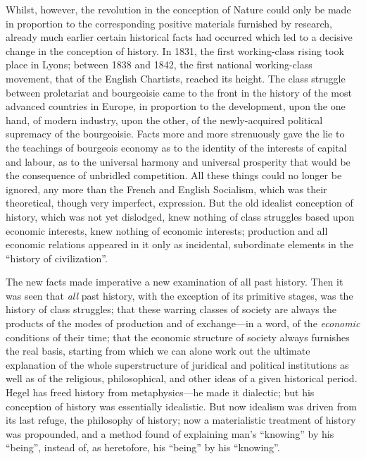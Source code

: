Whilst, however, the revolution in the conception of Nature could only be made
in proportion to the corresponding positive materials furnished by research,
already much earlier certain historical facts had occurred which led to a
decisive change in the conception of history. In 1831, the first working-class
rising took place in Lyons; between 1838 and 1842, the first national
working-class movement, that of the English Chartists, reached its height. The
class struggle between proletariat and bourgeoisie came to the front in the
history of the most advanced countries in Europe, in proportion to the
development, upon the one hand, of modern industry, upon the other, of the
newly-acquired political supremacy of the bourgeoisie. Facts more and more
strenuously gave the lie to the teachings of bourgeois economy as to the
identity of the interests of capital and labour, as to the universal harmony and
universal prosperity that would be the consequence of unbridled competition. All
these things could no longer be ignored, any more than the French and English
Socialism, which was their theoretical, though very imperfect, expression. But
the old idealist conception of history, which was not yet dislodged, knew
nothing of class struggles based upon economic interests, knew nothing of
economic interests; production and all economic relations appeared in it only as
incidental, subordinate elements in the ``history of civilization''.

The new facts made imperative a new examination of all past history. Then it was
seen that \emph{all} past history, with the exception of its primitive stages,
was the history of class struggles; that these warring classes of society are
always the products of the modes of production and of exchange---in a word, of
the \emph{economic} conditions of their time; that the economic structure of
society always furnishes the real basis, starting from which we can alone work
out the ultimate explanation of the whole superstructure of juridical and
political institutions as well as of the religious, philosophical, and other
ideas of a given historical period. Hegel has freed history from 
metaphysics---he made it dialectic; but his conception of history was
essentially idealistic. But now idealism was driven from its last refuge, the
philosophy of history; now a materialistic treatment of history was propounded,
and a method found of explaining man's ``knowing'' by his ``being'', instead of,
as heretofore, his ``being'' by his ``knowing''.

